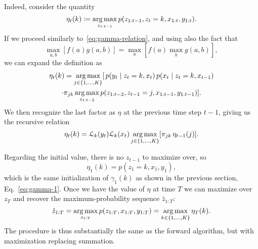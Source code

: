\documentclass[
  10pt, twocolumn, headings=normal,
  footlines=1, DIV=calc
]{scrartcl}
\begin{document}
Indeed, consider the quantity
\begin{equation}
  \eta_{t}(k) \coloneq \operatorname*{arg\,max}_{z_{1:t-1}}
    p(z_{1:t-1}, z_{t} = k, x_{1:t}, y_{1:t}).
\end{equation}
If we proceed similarly to~\eqref{eq:gamma-relation}, and using also the fact
that
\begin{equation}
  \max_{a,b} [f(a) g(a, b)] = \max_{a}[f(a) \max_{b} g(a, b)],
\end{equation}
we can expand the definition as
\begin{multline}
  \eta_{t}(k) = \operatorname*{arg\,max}_{j \in \{1, \ldots, K\}}
    [\, p(y_{t} \;\vert\; z_{t} = k, x_{t}) \,
    p(x_{t} \;\vert\; z_{t} = k, x_{t-1}) \\
    \cdot \pi_{jk} \operatorname*{arg\,max}_{z_{1:t-2}}
    p(z_{1:t-2}, z_{t-1} = j, x_{1:t-1}, y_{1:t-1})].
\end{multline}
We then recognize the last factor as $\eta$ at the previous time step $t-1$,
giving us the recursive relation
\begin{equation}
  \eta_{t}(k) = \mathcal{L}_{k}(y_{t}) \mathcal{L}_{k}(x_{t})
  \operatorname*{arg\,max}_{j \in \{1, \ldots, K\}} [ \pi_{jk} \, \eta_{t-1}(j)].
\end{equation}

Regarding the initial value, there is no $z_{t-1}$ to maximize over, so
\begin{equation}
  \eta_{1}(k) = p(z_{1} = k, x_{1}, y_{1}),
\end{equation}
which is the same initialization of $\gamma_{1}(k)$ as shown in the previous
section, Eq.~\eqref{eq:gamma-1}. Once we have the value of $\eta$ at time $T$ we
can maximize over $z_{T}$ and recover the maximum-probability sequence
$\hat{z}_{1:T}$:
\begin{equation}
  \hat{z}_{1:T} = 
  \operatorname*{arg\,max}_{z_{1:T}} p(z_{1:T}, x_{1:T}, y_{1:T}) =
  \operatorname*{arg\,max}_{k \in \{1, \ldots, K\}} \eta_{T}(k).
\end{equation}
The procedure is thus substantially the same as the forward algorithm, but with
maximization replacing summation.

\printbibliography
\end{document}
